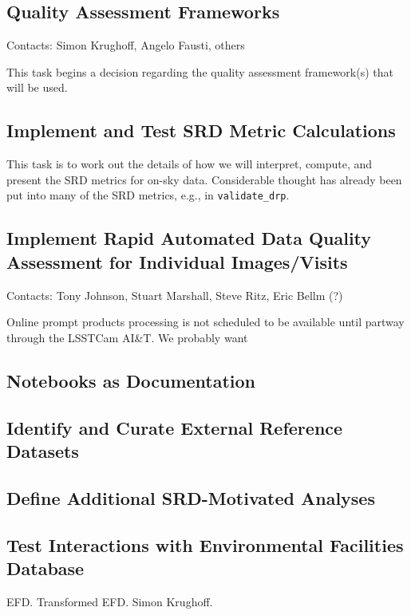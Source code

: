 \documentclass[DM,lsstdraft,toc]{lsstdoc}
\begin{document}
\subsection{Quality Assessment Frameworks}

Contacts: Simon Krughoff, Angelo Fausti, others

This task begins a decision regarding the quality assessment framework(s) that will be used. 

\subsection{Implement and Test SRD Metric Calculations}

This task is to work out the details of how we will interpret, compute, and present the SRD metrics for on-sky data.
Considerable thought has already been put into many of the SRD metrics, e.g., in \texttt{validate\_drp}.

\subsection{Implement Rapid Automated Data Quality Assessment for Individual Images/Visits}

Contacts: Tony Johnson, Stuart Marshall, Steve Ritz, Eric Bellm (?)

Online prompt products processing is not scheduled to be available until partway through the LSSTCam AI\&T. 
We probably want 

\subsection{Notebooks as Documentation}

\subsection{Identify and Curate External Reference Datasets}

\subsection{Define Additional SRD-Motivated Analyses}

\subsection{Test Interactions with Environmental Facilities Database}

EFD. Transformed EFD. Simon Krughoff.
\end{document}
